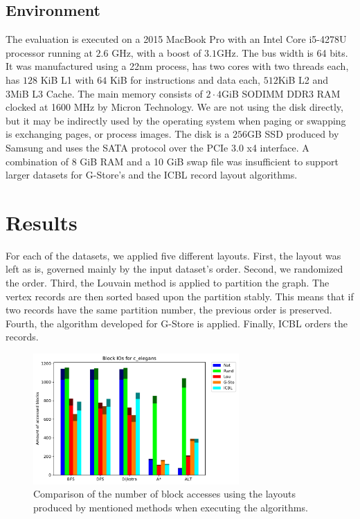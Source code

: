     \subsection*{Environment}
        The evaluation is executed on a 2015 MacBook Pro with an Intel Core i5-4278U processor running at $2.6$ GHz, with a boost of $3.1$GHz. The bus width is 64 bits. 
        It was manufactured using a 22nm process, has two cores with two threads each, has $128$ KiB L1 with $64$ KiB for instructions and data each, $512$KiB L2 and 3MiB L3 Cache.
        The main memory consists of $2 \cdot 4$GiB SODIMM DDR3 RAM clocked at 1600 MHz by Micron Technology.
        We are not using the disk directly, but it may be indirectly used by the operating system when paging or swapping is exchanging pages, or process images.
        The disk is a $256$GB SSD produced by Samsung and uses the SATA protocol over the PCIe 3.0 x4 interface. A combination of 8 GiB RAM and a 10 GiB swap file was insufficient to support larger datasets for G-Store's and the ICBL record layout algorithms.
    
\section{Results}\label{\positionnumber}
    For each of the datasets, we applied five different layouts. 
    First, the layout was left as is, governed mainly by the input dataset's order.
    Second, we randomized the order.
    Third, the Louvain method is applied to partition the graph. The vertex records are then sorted based upon the partition stably. This means that if two records have the same partition number, the previous order is preserved.
    Fourth, the algorithm developed for G-Store is applied.
    Finally, ICBL orders the records.
     \begin{figure}[htp]
        \begin{center}
            \includegraphics[keepaspectratio,width=0.7\textwidth]{img/07-eval/c_elegans_Block_unsorted_io_comparison.pdf}
        \end{center}
        \caption{Comparison of the number of block accesses using the layouts produced by mentioned methods when executing the algorithms.} 
        \label{celegans_b}
    \end{figure}
    
